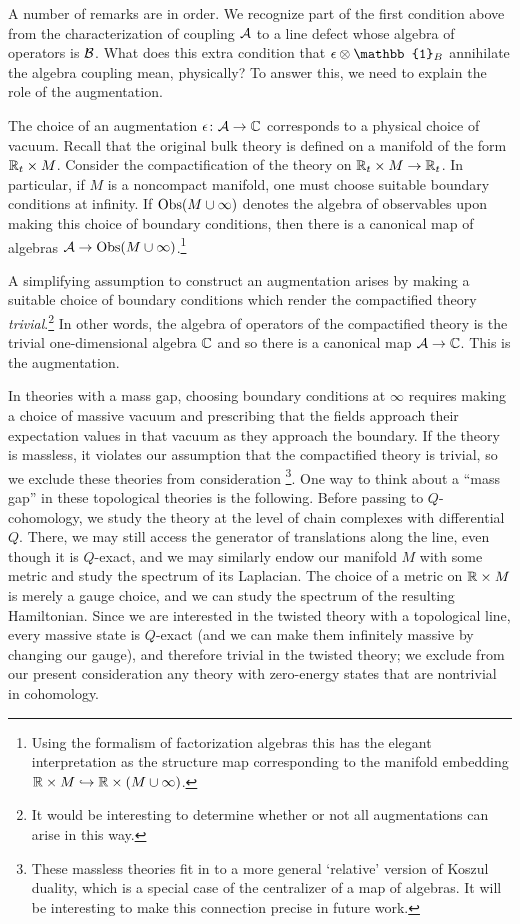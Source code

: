 \documentclass[11pt]{amsart}
\def\id{\mathbb{1}}
\begin{document}
A number of remarks are in order. 
We recognize part of the first condition above from the characterization of coupling $\mathcal A$ to a line defect whose algebra of operators is $\mathcal B$.
What does this extra condition that $\ep \otimes \id_B$ annihilate the algebra coupling mean, physically? 
To answer this, we need to explain the role of the augmentation.

The choice of an augmentation $\epsilon \colon \mathcal A \to \mathbb C$ corresponds to a physical choice of vacuum. 
Recall that the original bulk theory is defined on a manifold of the form $\mathbb R_t \times M$. 
Consider the compactification of the theory on $\mathbb R_t \times M \rightarrow \mathbb R_t$. 
In particular, if $M$ is a noncompact manifold, one must choose suitable boundary conditions at infinity. 
If ${\rm Obs}(M \cup \infty)$ denotes the algebra of observables upon making this choice of boundary conditions, then there is a canonical map of algebras $\mathcal A \to {\rm Obs}(M \cup \infty)$.\footnote{Using the formalism of factorization algebras this has the elegant interpretation as the structure map corresponding to the manifold embedding $\mathbb R \times M \hookrightarrow \mathbb R \times (M \cup \infty)$.} 

A simplifying assumption to construct an augmentation arises by making a suitable choice of boundary conditions which render the compactified theory {\em trivial}.\footnote{It would be interesting to determine whether or not all augmentations can arise in this way.}
In other words, the algebra of operators of the compactified theory is the trivial one-dimensional algebra $\mathbb C$ and so there is a canonical map $\mathcal A \to \mathbb C$.
This is the augmentation. 

In theories with a mass gap, choosing boundary conditions at $\infty$ requires making a choice of massive vacuum and prescribing that the fields approach their expectation values in that vacuum as they approach the boundary. If the theory is massless, it violates our assumption that the compactified theory is trivial, so we exclude these theories from consideration \footnote{These massless theories fit in to a more general `relative' version of Koszul duality, which is a special case of the centralizer of a map of algebras. It will be interesting to make this connection precise in future work.}. One way to think about a ``mass gap'' in these topological theories is the following. Before passing to $Q$-cohomology, we study the theory at the level of chain complexes with differential $Q$. There, we may still access the generator of translations along the line, even though it is $Q$-exact, and we may similarly endow our manifold $M$ with some metric and study the spectrum of its Laplacian. The choice of a metric on $\mathbb R \times M$ is merely a gauge choice, and we can study the spectrum of the resulting Hamiltonian. Since we are interested in the twisted theory with a topological line, every massive state is $Q$-exact (and we can make them infinitely massive by changing our gauge), and therefore trivial in the twisted theory; we exclude from our present consideration any theory with zero-energy states that are nontrivial in cohomology. 
\end{document}
